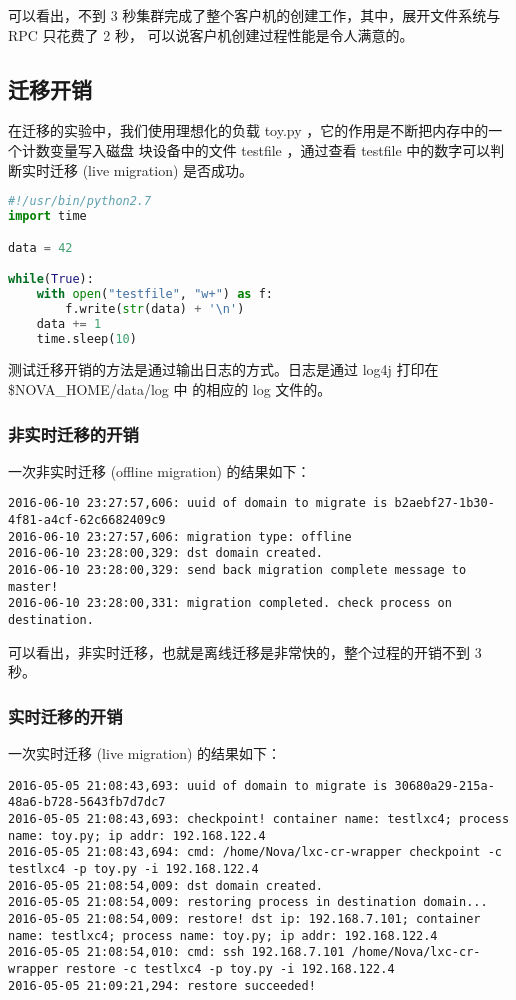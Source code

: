 可以看出，不到 3 秒集群完成了整个客户机的创建工作，其中，展开文件系统与 RPC 只花费了 2 秒，
可以说客户机创建过程性能是令人满意的。

\subsection{迁移开销}

在迁移的实验中，我们使用理想化的负载 toy.py ，它的作用是不断把内存中的一个计数变量写入磁盘
块设备中的文件 testfile ，通过查看 testfile 中的数字可以判断实时迁移 (live migration)
是否成功。

\begin{lstlisting}[language=Python]
#!/usr/bin/python2.7
import time

data = 42

while(True):
    with open("testfile", "w+") as f:
        f.write(str(data) + '\n')
    data += 1
    time.sleep(10)
\end{lstlisting}

测试迁移开销的方法是通过输出日志的方式。日志是通过 log4j 打印在 \$NOVA\_HOME/data/log 中
的相应的 log 文件的。

\subsubsection{非实时迁移的开销}

一次非实时迁移 (offline migration) 的结果如下：

\begin{lstlisting}
2016-06-10 23:27:57,606: uuid of domain to migrate is b2aebf27-1b30-4f81-a4cf-62c6682409c9
2016-06-10 23:27:57,606: migration type: offline
2016-06-10 23:28:00,329: dst domain created.
2016-06-10 23:28:00,329: send back migration complete message to master!
2016-06-10 23:28:00,331: migration completed. check process on destination.
\end{lstlisting}

可以看出，非实时迁移，也就是离线迁移是非常快的，整个过程的开销不到 3 秒。

\subsubsection{实时迁移的开销}

一次实时迁移 (live migration) 的结果如下：

\begin{lstlisting}
2016-05-05 21:08:43,693: uuid of domain to migrate is 30680a29-215a-48a6-b728-5643fb7d7dc7
2016-05-05 21:08:43,693: checkpoint! container name: testlxc4; process name: toy.py; ip addr: 192.168.122.4
2016-05-05 21:08:43,694: cmd: /home/Nova/lxc-cr-wrapper checkpoint -c testlxc4 -p toy.py -i 192.168.122.4
2016-05-05 21:08:54,009: dst domain created.
2016-05-05 21:08:54,009: restoring process in destination domain...
2016-05-05 21:08:54,009: restore! dst ip: 192.168.7.101; container name: testlxc4; process name: toy.py; ip addr: 192.168.122.4
2016-05-05 21:08:54,010: cmd: ssh 192.168.7.101 /home/Nova/lxc-cr-wrapper restore -c testlxc4 -p toy.py -i 192.168.122.4
2016-05-05 21:09:21,294: restore succeeded!
\end{lstlisting}

